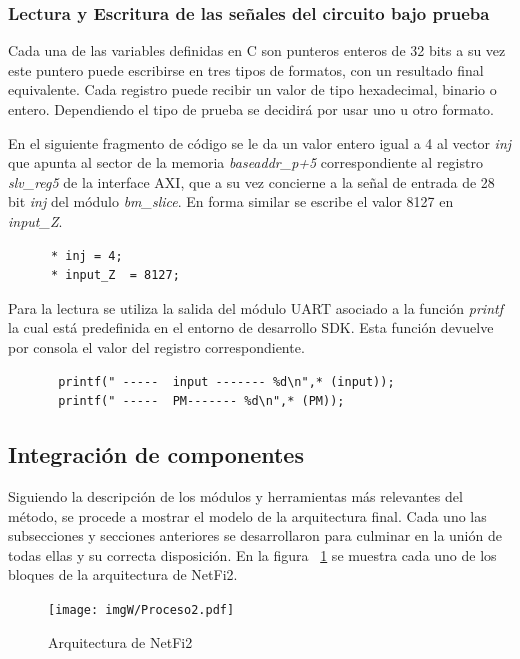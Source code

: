 \documentclass[a4paper,openright,12pt]{report}
\begin{document}
      \subsubsection{ Lectura y Escritura de las señales del circuito bajo prueba}
      
		Cada una de las variables definidas en C son punteros enteros de 32 bits a su vez este puntero puede escribirse en tres tipos de formatos, con un resultado final equivalente. Cada registro puede recibir un valor de tipo hexadecimal, binario o entero. Dependiendo el tipo de prueba se decidirá por usar uno u otro formato. 
        
        
        En el siguiente fragmento de código se le da un valor entero igual a 4  al vector \textit{inj} que apunta al sector de la memoria \textit{baseaddr\_p+5} correspondiente al registro \textit{slv\_reg5} de la interface AXI, que a su vez concierne a la señal de entrada de 28 bit \textit{inj} del módulo \textit{bm\_slice}. En forma similar se escribe el valor 8127 en \textit{input\_Z}.
      \begin{lstlisting}
      * inj = 4;
      * input_Z  = 8127;
     \end{lstlisting}
     Para la lectura se utiliza la salida del módulo UART asociado  a la función \textit{printf} la cual está predefinida en el entorno de desarrollo SDK. Esta función devuelve por consola el valor del registro correspondiente.      
      \begin{lstlisting}
       printf(" -----  input ------- %d\n",* (input));
       printf(" -----  PM------- %d\n",* (PM));
     \end{lstlisting}
     
     
    \subsection{Integración de componentes}
   
   Siguiendo la descripción de los módulos y herramientas más relevantes del método, se procede a mostrar el modelo de la arquitectura final. Cada uno las subsecciones y secciones anteriores se desarrollaron para culminar en la unión de todas ellas y su correcta disposición. En la  figura ~\ref{proceso2} se muestra cada uno de los bloques  de la arquitectura de NetFi2.
   
    
    \begin{figure}[H]
	\centering
	\texttt{[image: imgW/Proceso2.pdf]}
	\caption{Arquitectura  de  NetFi2 }
	\label{proceso2}
    \end{figure}
   
\end{document}
